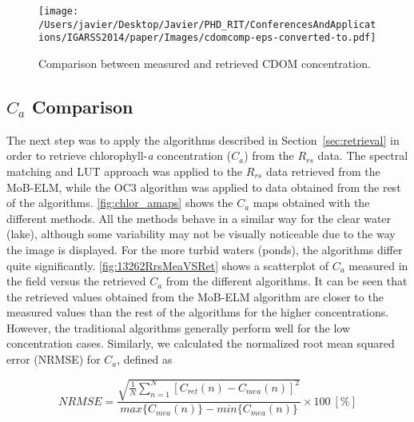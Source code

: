 \begin{figure}[htb]
\centering
    \texttt{[image: /Users/javier/Desktop/Javier/PHD\_RIT/ConferencesAndApplications/IGARSS2014/paper/Images/cdomcomp-eps-converted-to.pdf]}    
    \caption{Comparison between measured and retrieved CDOM concentration.}
    \label{fig:cdomcomp} 
\end{figure}  

\subsection{$C_a$ Comparison}
The next step was to apply the algorithms described in Section~\ref{sec:retrieval} in order to retrieve chlorophyll-{\it a} concentration ($C_a$) from the $R_{rs}$ data. The spectral matching and LUT approach was applied to the $R_{rs}$ data retrieved from the MoB-ELM, while the OC3 algorithm was applied to data obtained from the rest of the algorithms. \autoref{fig:chlor_amaps} shows the $C_a$ maps obtained with the different methods. All the methods behave in a similar way for the clear water (lake), although some variability may not be visually noticeable due to the way the image is displayed. For the more turbid waters (ponds), the algorithms differ quite significantly. \autoref{fig:13262RrsMeaVSRet} shows a scatterplot of $C_a$ measured in the field versus the retrieved $C_a$ from the different algorithms. It can be seen that the retrieved values obtained from the MoB-ELM algorithm are closer to the measured values than the rest of the algorithms for the higher concentrations. However, the traditional algorithms generally perform well for the low concentration cases. Similarly, we calculated the normalized root mean squared error (NRMSE) for $C_a$, defined as

\begin{equation}
\label{eq:NRMSEchl}
  NRMSE =\frac{\sqrt{\frac{1}{N}\sum_{n=1}^N{\left[C_{ret}(n) - C_{mea}(n)\right]^2}}}{max\{C_{mea}(n)\} - min\{C_{mea}(n)\}}\times100 ~[\%]
\end{equation}

